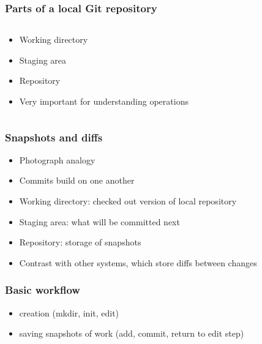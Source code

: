 \documentclass{git_course}
\begin{document}
\begin{frame}[fragile]
\frametitle{Parts of a local Git repository}
\begin{columns}[T]
    \begin{column}{0.5\textwidth}
        \begin{itemize}
            \item Working directory
            \item Staging area
            \item Repository
            \item Very important for understanding operations
        \end{itemize}
    \end{column}

    \begin{column}{0.5\textwidth}
        \begin{center}
            \resizebox{!}{0.7\textheight}{
                
            }
        \end{center}
    \end{column}
\end{columns}
\end{frame}

\begin{frame}
\frametitle{Snapshots and diffs}
\begin{itemize}
    \item Photograph analogy
    \item Commits build on one another
    \item Working directory: checked out version of local repository
    \item Staging area: what will be committed next
    \item Repository: storage of snapshots
    \item Contrast with other systems, which store diffs between changes
\end{itemize}
\end{frame}

\begin{frame}
\frametitle{Basic workflow}
\begin{itemize}
    \item creation (mkdir, init, edit)
    \item saving snapshots of work (add, commit, return to edit step)
\end{itemize}
\end{frame}
\end{document}
